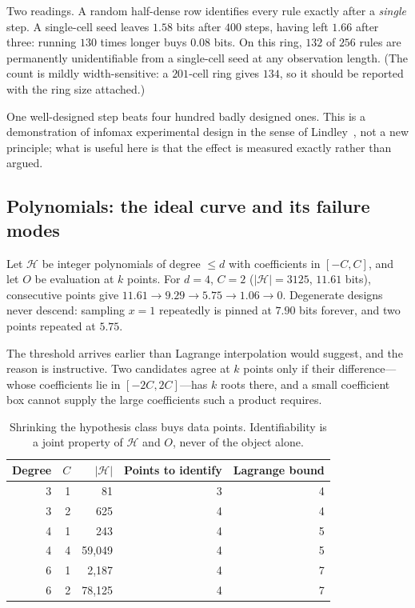 \documentclass[11pt]{article}
\newcommand{\HH}{\ensuremath{\mathcal{H}}}
\begin{document}
Two readings. A random half-dense row identifies every rule exactly after a
\emph{single} step. A single-cell seed leaves $1.58$ bits after $400$ steps, having
left $1.66$ after three: running $130$ times longer buys $0.08$ bits. On this ring,
$132$ of $256$ rules are permanently unidentifiable from a single-cell seed at any
observation length. (The count is mildly width-sensitive: a $201$-cell ring gives
$134$, so it should be reported with the ring size attached.)

One well-designed step beats four hundred badly designed ones. This is a demonstration
of infomax experimental design in the sense of Lindley~\cite{lindley1956}, not a new
principle; what is useful here is that the effect is measured exactly rather than
argued.

\subsection{Polynomials: the ideal curve and its failure modes}

Let $\HH$ be integer polynomials of degree $\le d$ with coefficients in $[-C,C]$, and
let $O$ be evaluation at $k$ points. For $d=4$, $C=2$ ($|\HH|=3125$, $11.61$ bits),
consecutive points give $11.61 \to 9.29 \to 5.75 \to 1.06 \to 0$. Degenerate designs
never descend: sampling $x=1$ repeatedly is pinned at $7.90$ bits forever, and two
points repeated at $5.75$.

The threshold arrives earlier than Lagrange interpolation would suggest, and the reason
is instructive. Two candidates agree at $k$ points only if their difference---whose
coefficients lie in $[-2C,2C]$---has $k$ roots there, and a small coefficient box
cannot supply the large coefficients such a product requires.

\begin{table}[h]
\centering
\begin{tabular}{rrrrr}
\toprule
Degree & $C$ & $|\HH|$ & Points to identify & Lagrange bound \\
\midrule
3 & 1 & 81 & 3 & 4 \\
3 & 2 & 625 & 4 & 4 \\
4 & 1 & 243 & 4 & 5 \\
4 & 4 & 59{,}049 & 4 & 5 \\
6 & 1 & 2{,}187 & 4 & 7 \\
6 & 2 & 78{,}125 & 4 & 7 \\
\bottomrule
\end{tabular}
\caption{Shrinking the hypothesis class buys data points. Identifiability is a joint
property of $\HH$ and $O$, never of the object alone.}
\end{table}
\end{document}
